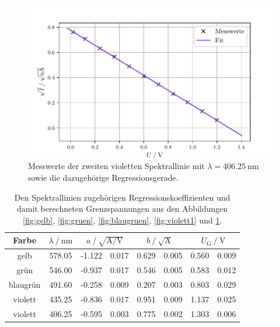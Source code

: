 \begin{figure}[H]
  \centering
  \includegraphics{violett2.pdf}
  \caption{Messwerte der zweiten violetten Spektrallinie mit $\lambda = \SI{406.25}{\nano\meter}$ sowie die dazugehörige Regressionsgerade.}
  \label{fig:violett2}
\end{figure}

\begin{table}[H]
  \centering
  \caption{Den Spektrallinien zugehörigen Regressionskoeffizienten und damit berechneten Grenzspannungen aus den Abbildungen \ref{fig:gelb}, \ref{fig:gruen},
  \ref{fig:blaugruen}, \ref{fig:violett1} und \ref{fig:violett2}.}
  \label{tab:grenz}
  \begin{tabular}{c S[table-format=3.2]
    S[table-format=2.3]@{${}\pm{}$}S[table-format=1.3]
    S[table-format=1.3]@{${}\pm{}$}S[table-format=1.3]
    S[table-format=1.3]@{${}\pm{}$}S[table-format=1.3]}
    \toprule
    {Farbe} & {$\lambda \:/\: \si{\nano\meter}$} &  &
     & \\
    \midrule
    gelb          &   578.05   &   -1.122  &  0.017    &    0.629  &  0.005    &    0.560  &   0.009 \\
    grün          &   546.00   &   -0.937  &  0.017    &    0.546  &  0.005    &    0.583  &   0.012 \\
    blaugrün      &   491.60   &   -0.258  &  0.009    &    0.207  &  0.003    &    0.803  &   0.029 \\
    violett       &   435.25   &   -0.836  &  0.017    &    0.951  &  0.009    &    1.137  &   0.025 \\
    violett       &   406.25   &   -0.595  &  0.003    &    0.775  &  0.002    &    1.303  &   0.006 \\
  \end{tabular}
\end{table}

